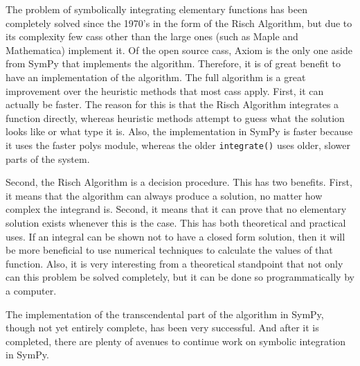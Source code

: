 The problem of symbolically integrating \gls{elementary} functions has
been completely solved since the 1970's in the form of the Risch
Algorithm, but due to its complexity few \glspl{cas} other than the
large ones (such as Maple and Mathematica) implement it.  Of the open
source \glspl{cas}, Axiom is the only one aside from SymPy that
implements the algorithm.  Therefore, it is of great benefit to have an
implementation of the algorithm.  The full algorithm is a great
improvement over the heuristic methods that most \glspl{cas} apply. 
First, it can actually be faster.  The reason for this is that the Risch
Algorithm integrates a function directly, whereas heuristic methods
attempt to guess what the solution looks like or what type it is.  Also,
the \rischintegrate{} implementation in SymPy is faster because it uses
the faster polys module, whereas the older \texttt{integrate()} uses
older, slower parts of the system.

Second, the Risch Algorithm is a decision procedure.  This has two
benefits.  First, it means that the algorithm can always produce a
solution, no matter how complex the \gls{integrand} is.  Second, it
means that it can prove that no \gls{elementary} solution exists
whenever this is the case. This has both theoretical and practical uses.
 If an integral can be shown not to have a closed form solution, then it
will be more beneficial to use numerical techniques to calculate the
values of that function.  Also, it is very interesting from a
theoretical standpoint that not only can this problem be solved
completely, but it can be done so programmatically by a computer.

The implementation of the \gls{transcendental} part of the algorithm in
SymPy, though not yet entirely complete, has been very successful. 
And after it is completed, there are plenty of avenues to continue work on
symbolic integration in SymPy.
